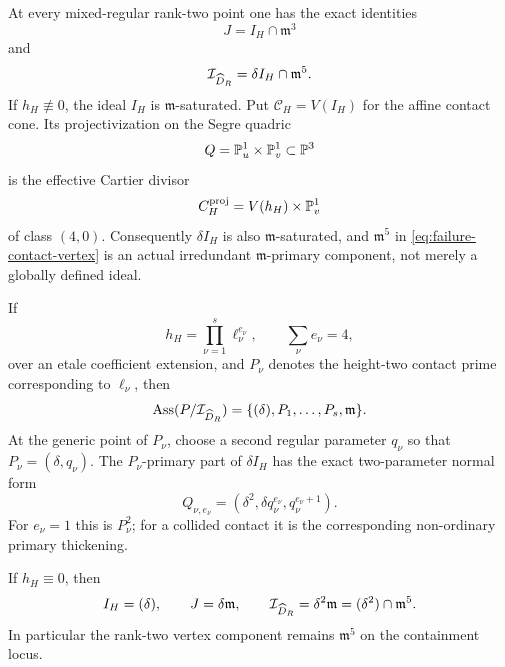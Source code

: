 \begin{theorem}
\label{thm:saturated-contact}
At every mixed-regular rank-two point one has the exact identities
\begin{equation}\label{eq:J-contact-intersection}
 J=I_H\cap\mathfrak m^3
\end{equation}
and
\begin{equation}\label{eq:failure-contact-vertex}
 \mathcal I_{\widehat D_R}
 =\delta I_H\cap\mathfrak m^5.
\end{equation}
If \(h_H\not\equiv0\), the ideal \(I_H\) is
\(\mathfrak m\)-saturated.  Put \(\mathcal C_H=V(I_H)\) for the affine contact cone.  Its
projectivization on the Segre quadric
\[
 Q=\mathbb P^1_u\times\mathbb P^1_v\subset\mathbb P^3
\]
is the effective Cartier divisor
\begin{equation}\label{eq:contact-Cartier-divisor}
 C_H^{\mathrm{proj}}=V(h_H)\times\mathbb P^1_v
\end{equation}
of class \((4,0)\).  Consequently \(\delta I_H\) is also
\(\mathfrak m\)-saturated, and \(\mathfrak m^5\) in
\eqref{eq:failure-contact-vertex} is an actual irredundant
\(\mathfrak m\)-primary component, not merely a globally defined
ideal.

If
\[
 h_H=\prod_{\nu=1}^s\ell_\nu^{e_\nu},
 \qquad \sum_\nu e_\nu=4,
\]
over an etale coefficient extension, and \(P_\nu\) denotes the
height-two contact prime corresponding to \(\ell_\nu\), then
\begin{equation}\label{eq:associated-primes-mixed-regular}
 \operatorname{Ass}(P/\mathcal I_{\widehat D_R})
 =
 \{(\delta),P_1,\ldots,P_s,\mathfrak m\}.
\end{equation}
At the generic point of \(P_\nu\), choose a second regular parameter
\(q_\nu\) so that \(P_\nu=(\delta,q_\nu)\).  The
\(P_\nu\)-primary part of \(\delta I_H\) has the exact two-parameter
normal form
\begin{equation}\label{eq:collision-primary-type}
 Q_{\nu,e_\nu}
 =
 (\delta^2,\delta q_\nu^{e_\nu},q_\nu^{e_\nu+1}).
\end{equation}
For \(e_\nu=1\) this is \(P_\nu^2\); for a collided contact it is the
corresponding non-ordinary primary thickening.

If \(h_H\equiv0\), then
\begin{equation}\label{eq:containment-local-ideal}
 I_H=(\delta),\qquad
 J=\delta\mathfrak m,\qquad
 \mathcal I_{\widehat D_R}=\delta^2\mathfrak m
                  =(\delta^2)\cap\mathfrak m^5.
\end{equation}
In particular the rank-two vertex component remains
\(\mathfrak m^5\) on the containment locus.
\end{theorem}

